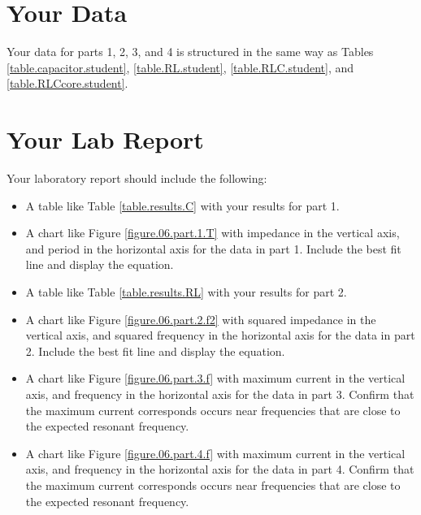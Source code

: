 \section{Your Data}
Your data for parts 1, 2, 3, and 4 is structured in the same way as Tables \ref{table.capacitor.student}, \ref{table.RL.student}, \ref{table.RLC.student}, and \ref{table.RLCcore.student}.
\pagebreak
\section{Your Lab Report}
Your laboratory report should include the following:
\begin{itemize}
	\item A table like Table \ref{table.results.C} with your results for part 1.
	\item A chart like Figure \ref{figure.06.part.1.T} with impedance in the vertical axis, and period in the horizontal axis for the data in part 1. Include the best fit line and display the equation.
	\item A table like Table \ref{table.results.RL} with your results for part 2.
	\item A chart like Figure \ref{figure.06.part.2.f2} with squared impedance in the vertical axis, and squared frequency in the horizontal axis for the data in part 2. Include the best fit line and display the equation.
	\item A chart like Figure \ref{figure.06.part.3.f} with maximum current in the vertical axis, and frequency in the horizontal axis for the data in part 3. Confirm that the maximum current corresponds occurs near frequencies that are close to the expected resonant frequency.
	\item A chart like Figure \ref{figure.06.part.4.f} with maximum current in the vertical axis, and frequency in the horizontal axis for the data in part 4. Confirm that the maximum current corresponds occurs near frequencies that are close to the expected resonant frequency.
\end{itemize}
\newpage

